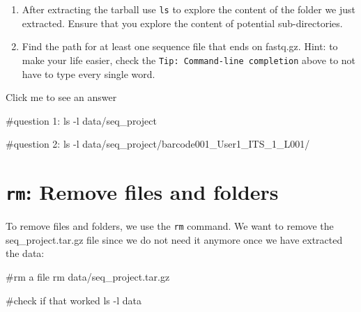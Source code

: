 \documentclass[
  letterpaper,
  DIV=11,
  numbers=noendperiod]{scrreprt}
\newenvironment{Shaded}{}{}
\newcommand{\AttributeTok}[1]{\textcolor[rgb]{0.84,0.23,0.29}{#1}}
\newcommand{\CommentTok}[1]{\textcolor[rgb]{0.42,0.45,0.49}{#1}}
\newcommand{\FunctionTok}[1]{\textcolor[rgb]{0.44,0.26,0.76}{#1}}
\newcommand{\NormalTok}[1]{\textcolor[rgb]{0.14,0.16,0.18}{#1}}
\providecommand{\tightlist}{%
  \setlength{\itemsep}{0pt}\setlength{\parskip}{0pt}}\usepackage{longtable,booktabs,array}
\begin{document}
\begin{tcolorbox}[enhanced jigsaw, breakable, left=2mm, title=\textcolor{quarto-callout-caution-color}{\faFire}\hspace{0.5em}{Exercise}, opacityback=0, opacitybacktitle=0.6, rightrule=.15mm, bottomrule=.15mm, colback=white, colframe=quarto-callout-caution-color-frame, coltitle=black, bottomtitle=1mm, arc=.35mm, toprule=.15mm, colbacktitle=quarto-callout-caution-color!10!white, toptitle=1mm, titlerule=0mm, leftrule=.75mm]

\begin{enumerate}
\def\labelenumi{\arabic{enumi}.}
\tightlist
\item
  After extracting the tarball use \texttt{ls} to explore the content of
  the folder we just extracted. Ensure that you explore the content of
  potential sub-directories.
\item
  Find the path for at least one sequence file that ends on fastq.gz.
  Hint: to make your life easier, check the
  \texttt{Tip:\ Command-line\ completion} above to not have to type
  every single word.
\end{enumerate}

Click me to see an answer

\begin{Shaded}
\begin{Highlighting}[]
\CommentTok{\#question 1:}
\FunctionTok{ls} \AttributeTok{{-}l}\NormalTok{ data/seq\_project}

\CommentTok{\#question 2:}
\FunctionTok{ls} \AttributeTok{{-}l}\NormalTok{ data/seq\_project/barcode001\_User1\_ITS\_1\_L001/}
\end{Highlighting}
\end{Shaded}

\end{tcolorbox}

\section{\texorpdfstring{\texttt{rm}: Remove files and
folders}{rm: Remove files and folders}}\label{rm-remove-files-and-folders}

To remove files and folders, we use the \texttt{rm} command. We want to
remove the seq\_project.tar.gz file since we do not need it anymore once
we have extracted the data:

\begin{Shaded}
\begin{Highlighting}[]
\CommentTok{\#rm a file}
\FunctionTok{rm}\NormalTok{ data/seq\_project.tar.gz}

\CommentTok{\#check if that worked}
\FunctionTok{ls} \AttributeTok{{-}l}\NormalTok{ data}
\end{Highlighting}
\end{Shaded}
\end{document}
